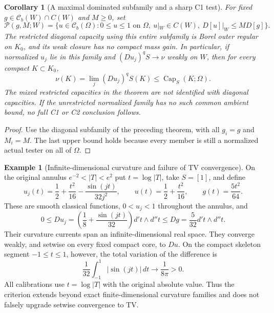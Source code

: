 \documentclass[11pt,a4paper]{article}
\numberwithin{equation}{section}
\newtheorem{corollary}[theorem]{Corollary}
\theoremstyle{definition}
\newtheorem{example}[theorem]{Example}
\theoremstyle{remark}
\begin{document}
\begin{corollary}[A maximal dominated subfamily and a sharp C1 test]
\label{cor:r6-maximal-dominated-capacity-family}
For fixed $g\in\mathcal C_b(W)\cap C(W)$ and $M\ge0$, set
\[
 \mathscr P(g,M;W)=\{u\in\mathcal C_b(\Omega):
         0\le u\le1\text{ on }\Omega,\ u|_W\in C(W),\
                                      D[u]|_W\le M D[g]\}.
\]
The restricted \emph{diagonal} capacity using this entire subfamily
is Borel outer regular on $K_0$, and its weak closure has no compact
mass gain. In particular, if normalized $u_j$ lie in this family and
$(Du_j)^qS\to\nu$ weakly on $W$, then for every compact
$K\subset K_0$,
\[
                  \nu(K)=\lim_j(Du_j)^qS(K)
                                      \le\operatorname{Cap}_S(K;\Omega).
\]
The mixed restricted capacities in the theorem are not identified
with diagonal capacities. If the unrestricted normalized family has
no such common ambient bound, no full C1 or C2 conclusion follows.
\end{corollary}

\begin{proof}
Use the diagonal subfamily of the preceding theorem, with all
$g_i=g$ and $M_i=M$. The last upper bound holds because every
member is still a normalized actual tester on all of $\Omega$.
\end{proof}

\begin{example}[Infinite-dimensional curvature and failure of TV convergence]
\label{ex:r6-dominated-curvature-not-tv}
On the original annulus $e^{-2}<|T|<e^2$ put $t=\log|T|$, take
$S=[1]$, and define
\[
 u_j(t)=\frac12+\frac{t^2}{16}-\frac{\sin(jt)}{32j^2},
 \qquad u(t)=\frac12+\frac{t^2}{16},
 \qquad g(t)=\frac{5t^2}{64}.
\]
These are smooth classical functions, $0<u_j<1$ throughout the
annulus, and
\[
 0\le D u_j
   =\left(\frac18+\frac{\sin(jt)}{32}\right)d't\wedge d''t
   \le Dg=\frac5{32}d't\wedge d''t.
\]
Their curvature currents span an infinite-dimensional real space.
They converge weakly, and setwise on every fixed compact core, to
$Du$. On the compact skeleton segment $-1\le t\le1$, however,
the total variation of the difference is
\[
             \frac1{32}\int_{-1}^1|\sin(jt)|\,dt
                                          \longrightarrow\frac1{8\pi}>0.
\]
All calibrations use $t=\log|T|$ with the original absolute value.
Thus the criterion extends beyond exact finite-dimensional curvature
families and does not falsely upgrade setwise convergence to TV.
\end{example}
\end{document}

